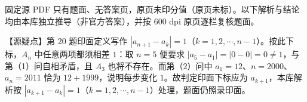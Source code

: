 

\begin{gktip}
固定源 PDF 只有题面、无答案页，原页未印分值（原页未标）。以下解析与结论均由本库独立推导（非官方答案），并按 600 dpi 原页逐栏复核题面。

【源疑点】第 20 题印面定义写作 $|a_{n+1}-a_k|=1$（$k=1,2,\cdots,n-1$）。按此下标，$A_n$ 中任意两项都须相差 $1$：取 $n=5$ 便要求 $|a_5-a_1|=|0-0|=0\neq1$，与第（1）问自相矛盾，且 $A_3$ 也将不存在。而第（2）问中 $a_1=12$、$n=2000$、$a_n=2011$ 恰为 $12+1999$，说明每步变化 $1$。故判定印面下标应为 $a_{k+1}$，本库解析按 $|a_{k+1}-a_k|=1$（$k=1,2,\cdots,n-1$）处理，题面仍照录印面。
\end{gktip}

